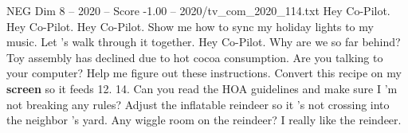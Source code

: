 \begin{textsample}{NEG Dim 8 – 2020 – Score -1.00 – 2020/tv\_com\_2020\_114.txt}  \label{ex:f8_neg_074}
Hey Co-Pilot.
Hey Co-Pilot.
Hey Co-Pilot.
Show me how to sync my holiday lights to my music.
Let 's walk through it together.
Hey Co-Pilot.
Why are we so far behind?
Toy assembly has declined due to hot cocoa consumption.
Are you talking to your computer?
Help me figure out these instructions.
Convert this recipe on my \textbf{screen} so it feeds 12. 14.
Can you read the HOA guidelines and make sure I 'm not breaking any rules?
Adjust the inflatable reindeer so it 's not crossing into the neighbor 's yard.
Any wiggle room on the reindeer?
I really like the reindeer.

\end{textsample}
